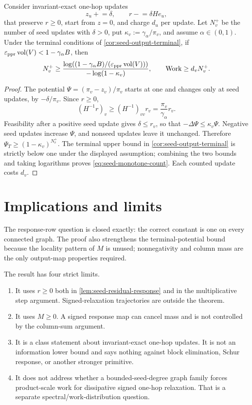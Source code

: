 \documentclass[11pt]{article}
\begin{document}
\begin{corollary}
\label{cor:seed-monotone-count}
Consider invariant-exact one-hop updates
\[
 z_u\mathrel{+}=\delta,
 \qquad r\mathrel{-}=\delta He_u,
\]
that preserve $r\ge0$, start from $z=0$, and charge $d_u$ per update.  Let
$N_v^+$ be the number of seed updates with $\delta>0$, put
$\kappa_v:=\gamma_{\alpha}/\pi_v$, and assume $\alpha\in(0,1)$.  Under the terminal
conditions of \cref{cor:seed-output-terminal}, if
$\varepsilon_{\mathrm{ppr}}\operatorname{vol}(V)<1-\gamma_{\alpha} B$, then
\begin{equation}
 N_v^+\ge
 \frac{\log\!\left((1-\gamma_{\alpha} B)/(\varepsilon_{\mathrm{ppr}}\operatorname{vol}(V))\right)}
      {-\log(1-\kappa_v)},
 \qquad
 \operatorname{Work}\ge d_vN_v^+.
 \label{eq:seed-monotone-count}
\end{equation}
\end{corollary}

\begin{proof}
The potential $\Psi=(\pi_v-z_v)/\pi_v$ starts at one and changes only at
seed updates, by $-\delta/\pi_v$.  Since $r\ge0$,
\[
 (H^{-1}r)_v\ge(H^{-1})_{vv}r_v
 =\frac{\pi_v}{\gamma_{\alpha}}r_v.
\]
Feasibility after a positive seed update gives $\delta\le r_v$, so that
$-\Delta\Psi\le\kappa_v\Psi$.  Negative seed updates increase $\Psi$, and
nonseed updates leave it unchanged.  Therefore
$\Psi_T\ge(1-\kappa_v)^{N_v^+}$.  The terminal upper bound in
\cref{cor:seed-output-terminal} is strictly below one under the displayed
assumption; combining the two bounds and taking logarithms proves
\eqref{eq:seed-monotone-count}.  Each counted update costs $d_v$.
\end{proof}

\section{Implications and limits}
\label{sec:seed-limits}

The response-row question is closed exactly: the correct constant is one on
every connected graph.  The proof also strengthens the terminal-potential
bound because the locality pattern of $M$ is unused; nonnegativity and column
mass are the only output-map properties required.

The result has four strict limits.
\begin{enumerate}
 \item It uses $r\ge0$ both in \cref{lem:seed-residual-response} and in the
   multiplicative step argument.  Signed-relaxation trajectories are outside
   the theorem.
 \item It uses $M\ge0$.  A signed response map can cancel mass and is not
   controlled by the column-sum argument.
 \item It is a class statement about invariant-exact one-hop updates.  It is
   not an information lower bound and says nothing against block elimination,
   Schur response, or another stronger primitive.
 \item It does not address whether a bounded-seed-degree graph family forces
   product-scale work for dissipative signed one-hop relaxation.  That is a
   separate spectral/work-distribution question.
\end{enumerate}
\end{document}
